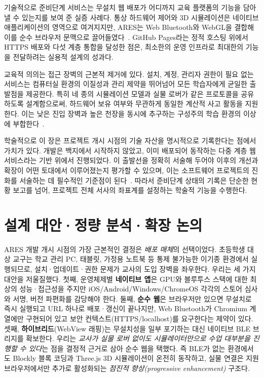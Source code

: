 기술적으로 준비단계 서비스는 무설치 웹 배포가 어디까지 교육 플랫폼의 기능을 담아낼 수 있는지를 보여 준 실증 사례다. 통상 하드웨어 제어와 3D 시뮬레이션은 네이티브 애플리케이션의 영역으로 여겨지지만, ARES는 Web Bluetooth와 WebGL을 결합해 이를 순수 브라우저 문맥으로 끌어들였다~\cite{webbluetooth, webgl}. GitHub Pages라는 정적 호스팅 위에서 HTTPS 배포와 다섯 계층 통합을 달성한 점은, 최소한의 운영 인프라로 최대한의 기능을 전달하려는 실용적 설계의 성과다.

교육적 의의는 접근 장벽의 근본적 제거에 있다. 설치, 계정, 관리자 권한이 필요 없는 서비스는 컴퓨터실 환경의 이질성과 관리 제약을 뛰어넘어 모든 학습자에게 균일한 출발점을 제공한다. 특히 네 종의 시뮬레이션 모델과 실물 로버가 같은 프로토콜을 공유하도록 설계함으로써, 하드웨어 보유 여부와 무관하게 동일한 계산적 사고 활동을 지원한다. 이는 낮은 진입 장벽과 높은 천장을 동시에 추구하는 구성주의 학습 환경의 이상에 부합한다~\cite{papert1980, resnick2009scratch}.

학술적으로 이 장은 프로젝트 개시 시점의 기술 자산을 명시적으로 기록한다는 점에서 가치가 있다. 개발은 백지에서 시작하지 않았고, 이미 배포되어 동작하는 다중 계층 웹 서비스라는 기반 위에서 진행되었다. 이 출발선을 정확히 서술해 두어야 이후의 개선과 확장이 어떤 토대에서 이루어졌는지 평가할 수 있으며, 이는 소프트웨어 프로젝트의 진화를 서술하는 데 필수적인 기준점이 된다~\cite{mcconnell2004codecomplete}. 따라서 준비단계 상태의 기록은 단순한 현황 보고를 넘어, 프로젝트 전체 서사의 좌표계를 설정하는 학술적 기능을 수행한다.


\section{설계 대안·정량 분석·확장 논의}

ARES 개발 개시 시점의 가장 근본적인 결정은 \emph{배포 매체}의 선택이었다. 초등학생 대상 교구는 학교 관리 PC, 태블릿, 가정용 노트북 등 통제 불가능한 이기종 환경에서 실행되므로, 설치·업데이트·권한 문제가 교사의 도입 장벽을 좌우한다. 우리는 세 가지 대안을 저울질했다. 첫째, 운영체제별 \textbf{네이티브 앱}은 GPU와 블루투스 스택에 대한 최상의 성능·접근성을 주지만 iOS/Android/Windows/ChromeOS 각각의 스토어 심사와 서명, 버전 파편화를 감당해야 한다. 둘째, \textbf{순수 웹}은 브라우저만 있으면 무설치로 즉시 실행되고 URL 하나로 배포·갱신이 끝나지만, Web Bluetooth\cite{webbluetooth}가 Chromium 계열에만 구현되어 있고 보안 컨텍스트(HTTPS/localhost)를 요구한다는 제약이 있다. 셋째, \textbf{하이브리드}(WebView 래핑)는 무설치성을 일부 포기하는 대신 네이티브 BLE 브리지를 확보한다. 우리는 \emph{교사가 실물 로버 없이도 시뮬레이터만으로 수업 대부분을 진행할 수 있다}는 점을 결정적 근거로 삼아 순수 웹을 택했다. 즉 BLE가 없는 환경에서도 Blockly\cite{blockly} 블록 코딩과 Three.js\cite{threejs} 3D 시뮬레이션이 온전히 동작하고, 실물 연결은 지원 브라우저에서만 추가로 활성화되는 \emph{점진적 향상(progressive enhancement)} 구조다\cite{marcotte2010responsive}.

